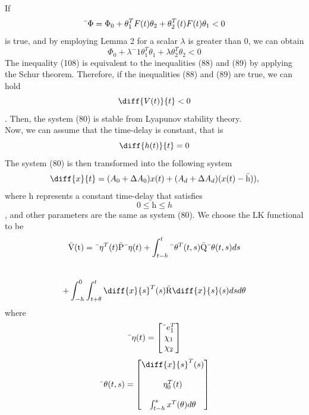 \documentclass[journal]{IEEEtran}
\begin{document}
\\
If
\begin{equation}
\text{\={$\Phi$}} = \Phi_0 + \theta^{T}_{1}F(t)\theta_2   +   \theta^{T}_{2}(t)F(t)\theta_1   < 0
\end{equation}
 is true, and by employing Lemma 2 for a scalar $\lambda$ is greater than 0, we can obtain 
\begin{equation}
\Phi_0 + \lambda^-1\theta^{T}_{1}\theta_1 + \lambda\theta^{T}_{2}\theta_2 < 0
\end{equation}
The inequality (108) is equivalent to the inequalities (88) and (89) by applying the Schur theorem. Therefore, if the inequalities (88) and (89) are true, we can hold 
\begin{equation}
\diff{V(t)}{t} < 0
\end{equation}
. Then, the system (80) is stable from Lyapunov stability theory. 
\\
Now, we can assume that the time-delay is constant, that is
\begin{equation}
\diff{h(t)}{t} = 0
\end{equation}
The system (80) is then transformed into the following system 
\begin{equation}
 \diff{x}{t}=(A_0 + \Delta A_0)x(t) + (A_d + \Delta A_d)(x(t)-\text{\={h}})),
\end{equation}
where $\text{\={h}}$ represents a constant time-delay that satisfies
\begin{equation}
0  \leqslant \text{\={h}} \leqslant h
\end{equation}
, and other parameters are the same as system (80). We choose the LK functional to be
\begin{equation}
\text{\={V(t)}} = \text{\={$\eta^T(t)$}}\text{\={P}} \text{\={$\eta(t)$}} + \int^{t}_{t-h}\text{\={$\theta^T(t,s)$}}\text{\={Q}}\text{\={$\theta(t,s)$}}ds 
\end{equation}
\\
\begin{equation}
+ \int^{0}_{-h}\int^{t}_{t + \theta}\diff{x}{s}^T(s)\text{\={R}}\diff{x}{s}(s)dsd\theta
\end{equation}
where 
\begin{equation}
\text{\={$\eta(t)$}} = 
\begin{bmatrix}
\text{\={$e^{T}_{1}$}} \\
 \chi_1 \\
 \chi_2
\end{bmatrix}
\end{equation}
\begin{equation}
\text{\={$\theta(t,s)$}} = 
\begin{bmatrix}
\diff{x}{s}^T(s) \\ \\
 \eta^{T}_{0}(t) \\ \\
 \int^{s}_{t-h}x^T(\theta)d\theta \\
\end{bmatrix}
\end{equation}
\end{document}

